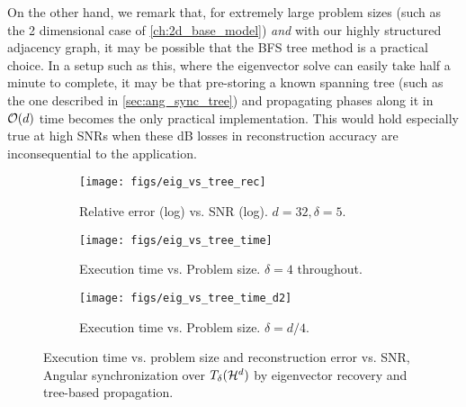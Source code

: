   On the other hand, we remark that, for extremely large problem sizes (such as the 2 dimensional case of \cref{ch:2d_base_model}) \emph{and} with our highly structured adjacency graph, it may be possible that the BFS tree method is a practical choice.  In a setup such as this, where the eigenvector solve can easily take half a minute to complete, it may be that pre-storing a known spanning tree (such as the one described in \cref{sec:ang_sync_tree}) and propagating phases along it in $\mathcal{O}(d)$ time becomes the only practical implementation.  This would hold especially true at high SNRs when these dB losses in reconstruction accuracy are inconsequential to the application.
  \begin{figure}[H]
  \centering
  \begin{subfigure}[b]{.49\textwidth}
    \centering
    \texttt{[image: figs/eig\_vs\_tree\_rec]}
    \caption{Relative error (log) vs. SNR (log).  $d = 32, \delta = 5$.}
    \label{fig:eig_vs_tree_rec}
  \end{subfigure}
  \begin{subfigure}[b]{.49\textwidth}
    \centering
    \texttt{[image: figs/eig\_vs\_tree\_time]}
    \caption{Execution time vs. Problem size.  $\delta = 4$ throughout.}
    \label{fig:eig_vs_tree_time}
  \end{subfigure}
  \begin{subfigure}[b]{.49\textwidth}
    \centering
    \texttt{[image: figs/eig\_vs\_tree\_time\_d2]}
    \caption{Execution time vs. Problem size.  $\delta = d / 4$.}
    \label{fig:eig_vs_tree_time_d2}
  \end{subfigure}
  \caption{Execution time vs. problem size and reconstruction error vs. SNR, Angular synchronization over $T_\delta(\mathcal{H}^d)$ by eigenvector recovery and tree-based propagation.}
  \label{fig:eig_vs_tree}
\end{figure}
